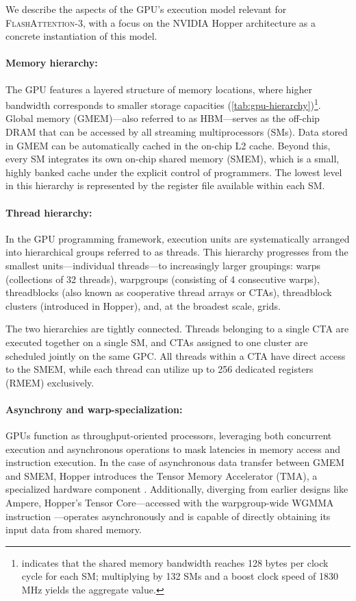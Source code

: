 We describe the aspects of the GPU's execution model relevant for \textsc{FlashAttention-3}, with a focus on the NVIDIA Hopper architecture as a concrete instantiation of this model.

\paragraph{Memory hierarchy:} The GPU features a layered structure of memory locations, where higher bandwidth corresponds to smaller storage capacities (\cref{tab:gpu-hierarchy})\footnote{\citet{luo2024benchmarking} indicates that the shared memory bandwidth reaches 128 bytes per clock cycle for each SM; multiplying by 132 SMs and a boost clock speed of 1830 MHz yields the aggregate value.}. Global memory (GMEM)—also referred to as HBM—serves as the off-chip DRAM that can be accessed by all streaming multiprocessors (SMs). Data stored in GMEM can be automatically cached in the on-chip L2 cache. Beyond this, every SM integrates its own on-chip shared memory (SMEM), which is a small, highly banked cache under the explicit control of programmers. The lowest level in this hierarchy is represented by the register file available within each SM.

\paragraph{Thread hierarchy:} In the GPU programming framework, execution units are systematically arranged into hierarchical groups referred to as threads. This hierarchy progresses from the smallest units—individual threads—to increasingly larger groupings: warps (collections of 32 threads), warpgroups (consisting of 4 consecutive warps), threadblocks (also known as cooperative thread arrays or CTAs), threadblock clusters (introduced in Hopper), and, at the broadest scale, grids.

The two hierarchies are tightly connected. Threads belonging to a single CTA are executed together on a single SM, and CTAs assigned to one cluster are scheduled jointly on the same GPC. All threads within a CTA have direct access to the SMEM, while each thread can utilize up to 256 dedicated registers (RMEM) exclusively.

\paragraph{Asynchrony and warp-specialization:}

GPUs function as throughput-oriented processors, leveraging both concurrent execution and asynchronous operations to mask latencies in memory access and instruction execution. In the case of asynchronous data transfer between GMEM and SMEM, Hopper introduces the Tensor Memory Accelerator (TMA), a specialized hardware component \cite[\S7.29]{cuda}. Additionally, diverging from earlier designs like Ampere, Hopper’s Tensor Core—accessed with the warpgroup-wide WGMMA instruction \cite[\S9.7.14]{ptx}—operates asynchronously and is capable of directly obtaining its input data from shared memory.

